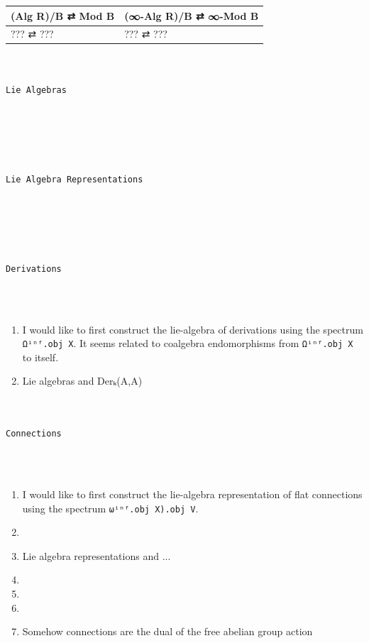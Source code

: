 \documentclass{book}
\theoremstyle{definition}
\renewcommand{\chapter}[1]{
\newpage
{
\Huge 
\begin{center}
\ \\
\ \\
\thispagestyle{empty}
\texttt{#1}
\end{center}}
\ \\
\ \\
}
\begin{document}
{
\footnotesize
\begin{center}
\begin{tabular}{|| l || l ||} 
\hline
(Alg R)/B ⇄ Mod B  & (∞-Alg R)/B ⇄ ∞-Mod B \\
 \hline 
??? ⇄ ???  & ??? ⇄ ??? \\
 \hline
\end{tabular}
\end{center}
}

\chapter{Lie Algebras}




\chapter{Lie Algebra Representations}





\chapter{Derivations}

\begin{enumerate}
\item I would like to first construct the lie-algebra of derivations using the spectrum \texttt{Ωⁱⁿᶠ.obj X}. It seems related to coalgebra endomorphisms from \texttt{Ωⁱⁿᶠ.obj X} to itself.\\
\item Lie algebras and Derₖ(A,A)
\end{enumerate}


\chapter{Connections}

\begin{enumerate}
\item I would like to first construct the lie-algebra representation of flat connections using the spectrum \texttt{ωⁱⁿᶠ.obj X).obj V}.
\item 
\item Lie algebra representations and ...
\item 
\item 
\item 
\item Somehow connections are the dual of the free abelian group action
\end{enumerate}
\end{document}
